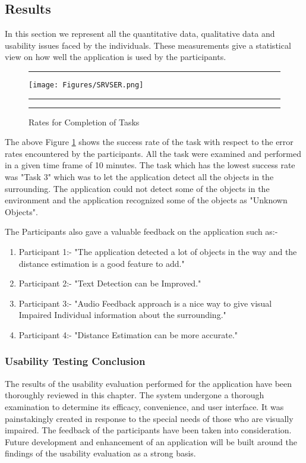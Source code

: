 \documentclass[MScCS]{uccthesis}
\begin{document}
\subsection{Results}
In this section we represent all the quantitative data, qualitative data and usability issues faced by the individuals.
These measurements give a statistical view on how well the application is used by the participants.
 \begin{figure}[H]
      \hrule
      \vspace{0.5em}
     \centering
      \texttt{[image: Figures/SRVSER.png]}
      \vspace{0.5em}
      \hrule
      \caption{\centering\label{fig:SRVSER}Rates for Completion of Tasks}
      \vspace{0.5em}
      \hrule
   \end{figure}

   The above Figure \ref{fig:SRVSER} shows the success rate of the task with respect to the error rates encountered by the participants. All the task were examined and performed in a given time frame of 10 minutes. The task which has the lowest success rate was "Task 3" which was to let the application detect all the objects in the surrounding. The application could not detect some of the objects in the environment and the application recognized some of the objects as "Unknown Objects". 

   The Participants also gave a valuable feedback on the application such as:-
   \begin{enumerate}
       \item Participant 1:- "The application detected a lot of objects in the way and the distance estimation is a good feature to add."
       \item Participant 2:- "Text Detection can be Improved."
       \item Participant 3:- "Audio Feedback approach is a nice way to give visual Impaired Individual information about the surrounding."
       \item Participant 4:- "Distance Estimation can be more accurate."
   \end{enumerate}

\subsubsection{Usability Testing Conclusion}

The results of the usability evaluation performed for the application have been thoroughly reviewed in this chapter. The system undergone a thorough examination to determine its efficacy, convenience, and user interface. It was painstakingly created in response to the special needs of those who are visually impaired. The feedback of the participants have been taken into consideration. Future development and enhancement of an application will be built around the findings of the usability evaluation as a strong basis. 
\end{document}
